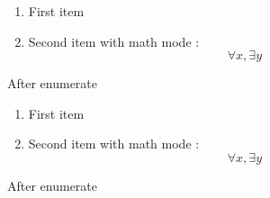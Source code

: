 \documentclass[10pt]{beamer}
\begin{document}
\begin{frame}
    \begin{enumerate}[<+->]%
        \item First item%
        \item Second item with math mode :%
            \[\forall x,\exists y\]%
    \end{enumerate}%
    \vspace*{-\baselineskip}
    After enumerate
\end{frame}

\begin{frame}
    \begin{enumerate}
        \item First item
        \item Second item with math mode :
            \[\forall x,\exists y\]    %
    \end{enumerate}
    \vspace*{-\baselineskip}
    After enumerate
\end{frame}
\end{document}
